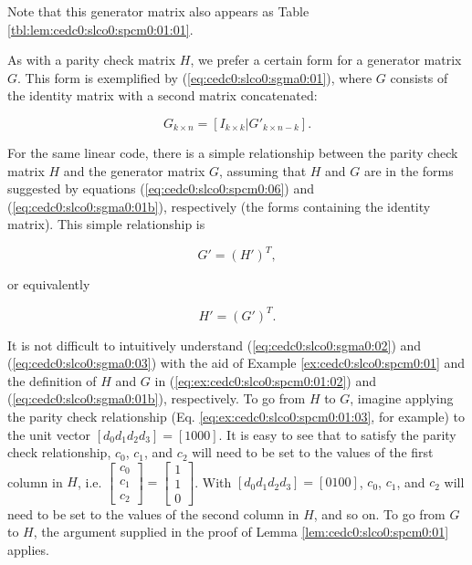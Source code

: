 \noindent{}Note that this generator matrix also appears as Table
\ref{tbl:lem:cedc0:slco0:spcm0:01:01}.

As with a parity check matrix $H$, we prefer a certain form for
a generator matrix $G$.  This form is exemplified by 
(\ref{eq:cedc0:slco0:sgma0:01}), where $G$ consists of 
the identity matrix with a second matrix concatenated:

\begin{equation}
\label{eq:cedc0:slco0:sgma0:01b}
G_{k \times n} = [ I_{k \times k} | G'_{k \times n-k}] .
\end{equation}

For the same linear code, there is a simple relationship between the 
parity check matrix $H$ and the generator matrix $G$, assuming that
$H$ and $G$ are in the forms suggested by equations 
(\ref{eq:cedc0:slco0:spcm0:06}) and (\ref{eq:cedc0:slco0:sgma0:01b}),
respectively (the forms containing the identity matrix).  This
simple relationship is 

\begin{equation}
\label{eq:cedc0:slco0:sgma0:02}
G' = (H')^T,
\end{equation}

\noindent{}or equivalently

\begin{equation}
\label{eq:cedc0:slco0:sgma0:03}
H' = (G')^T .
\end{equation}

It is not difficult to intuitively understand
(\ref{eq:cedc0:slco0:sgma0:02}) and (\ref{eq:cedc0:slco0:sgma0:03})
with the aid of Example \ref{ex:cedc0:slco0:spcm0:01} and the definition
of $H$ and $G$ in 
(\ref{eq:ex:cedc0:slco0:spcm0:01:02}) and
(\ref{eq:cedc0:slco0:sgma0:01b}), respectively.  To go from $H$ to $G$, 
imagine applying the parity check relationship (Eq. \ref{eq:ex:cedc0:slco0:spcm0:01:03}, 
for example) to the unit vector $[d_0 d_1 d_2 d_3] = [1 0 0 0]$.  It is easy to see that 
to satisfy the parity check relationship, $c_0$, $c_1$, and $c_2$ will need to be 
set to the values of the first column in $H$, i.e. 
$\left[\begin{array}{c}c_0\\c_1\\c_2\end{array}\right] = \left[\begin{array}{c}1\\1\\0\end{array}\right]$.
With $[d_0 d_1 d_2 d_3] = [0 1 0 0]$, $c_0$, $c_1$, and $c_2$ will need to be set
to the values of the second column in $H$, and so on.  To go from $G$ to 
$H$, the argument supplied in the proof of Lemma 
\ref{lem:cedc0:slco0:spcm0:01} applies.

